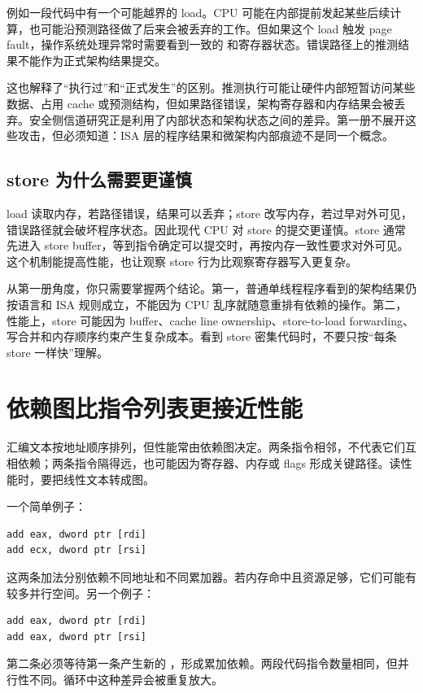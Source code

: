 例如一段代码中有一个可能越界的 load。CPU 可能在内部提前发起某些后续计算，也可能沿预测路径做了后来会被丢弃的工作。但如果这个 load 触发 page fault，操作系统处理异常时需要看到一致的  和寄存器状态。错误路径上的推测结果不能作为正式架构结果提交。

这也解释了“执行过”和“正式发生”的区别。推测执行可能让硬件内部短暂访问某些数据、占用 cache 或预测结构，但如果路径错误，架构寄存器和内存结果会被丢弃。安全侧信道研究正是利用了内部状态和架构状态之间的差异。第一册不展开这些攻击，但必须知道：ISA 层的程序结果和微架构内部痕迹不是同一个概念。

\subsection{store 为什么需要更谨慎}

load 读取内存，若路径错误，结果可以丢弃；store 改写内存，若过早对外可见，错误路径就会破坏程序状态。因此现代 CPU 对 store 的提交更谨慎。store 通常先进入 store buffer，等到指令确定可以提交时，再按内存一致性要求对外可见。这个机制能提高性能，也让观察 store 行为比观察寄存器写入更复杂。

从第一册角度，你只需要掌握两个结论。第一，普通单线程程序看到的架构结果仍按语言和 ISA 规则成立，不能因为 CPU 乱序就随意重排有依赖的操作。第二，性能上，store 可能因为 buffer、cache line ownership、store-to-load forwarding、写合并和内存顺序约束产生复杂成本。看到 store 密集代码时，不要只按“每条 store 一样快”理解。

\section{依赖图比指令列表更接近性能}

汇编文本按地址顺序排列，但性能常由依赖图决定。两条指令相邻，不代表它们互相依赖；两条指令隔得远，也可能因为寄存器、内存或 flags 形成关键路径。读性能时，要把线性文本转成图。

一个简单例子：

\begin{lstlisting}
add eax, dword ptr [rdi]
add ecx, dword ptr [rsi]
\end{lstlisting}

这两条加法分别依赖不同地址和不同累加器。若内存命中且资源足够，它们可能有较多并行空间。另一个例子：

\begin{lstlisting}
add eax, dword ptr [rdi]
add eax, dword ptr [rsi]
\end{lstlisting}

第二条必须等待第一条产生新的 ，形成累加依赖。两段代码指令数量相同，但并行性不同。循环中这种差异会被重复放大。

